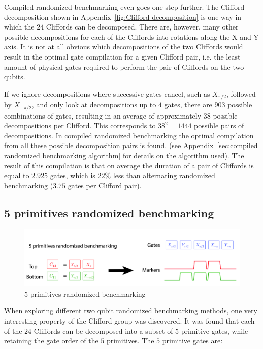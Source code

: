         Compiled randomized benchmarking even goes one step further. The Clifford decomposition shown in Appendix~\ref{fig:Clifford decomposition} is one way in which the $24$ Cliffords can be decomposed. There are, however, many other possible decompositions for each of the Cliffords into rotations along the X and Y axis. It is not at all obvious which decompositions of the two Cliffords would result in the optimal gate compilation for a given Clifford pair, i.e. the least amount of physical gates required to perform the pair of Cliffords on the two qubits.

        If we ignore decompositions where successive gates cancel, such as $X_{\pi/2}$, followed by $X_{-\pi/2}$, and only look at decompositions up to $4$ gates, there are $903$ possible combinations of gates, resulting in an average of approximately $38$ possible decompositions per Clifford. This corresponds to $38^2=1444$ possible pairs of decompositions. In compiled randomized benchmarking the optimal compilation from all these possible decomposition pairs is found. (see Appendix~\ref{sec:compiled randomized benchmarking algorithm} for details on the algorithm used). The result of this compilation is that on average the duration of a pair of Cliffords is equal to $2.925$ gates, which is $22\%$ less than alternating randomized benchmarking ($3.75$ gates per Clifford pair).

      \subsection{5 primitives randomized benchmarking}
        \label{ssec:5 primitives randomized benchmarking}

        \begin{figure}[tb]
          \centering
          \includegraphics[width=\textwidth]{../Figures/Randomized benchmarking/5 primitives RB.jpg}
          \caption{5 primitives randomized benchmarking}
          \label{fig:5 primitives RB schematic}
        \end{figure}

        When exploring different two qubit randomized benchmarking methods, one very interesting property of the Clifford group was discovered. It was found that each of the $24$ Cliffords can be decomposed into a subset of $5$ primitive gates, while retaining the gate order of the $5$ primitives. The $5$ primitive gates are:


